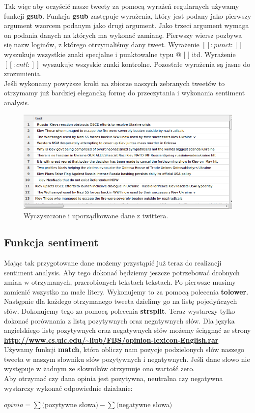 \documentclass[12pt,a4paper]{report}
\begin{document}
Tak więc aby oczyścić nasze tweety za pomocą wyrażeń regularnych używamy funkcji \textbf{gsub}. Funkcja \textbf{gsub} zastępuje wyrażenia, który jest podany jako pierwszy argument wzorcem podanym jako drugi argument. Jako trzeci argument wymaga on podania danych na których ma wykonać zamianę. Pierwszy wiersz pozbywa się nazw loginów, z którego otrzymaliśmy dany tweet. 
Wyrażenie \textbf{$[[:punct:]]$} wyszukuje wszystkie znaki specjalne i punktowalne typu @ [ ] itd. Wyrażenie \textbf{$[[:cntl:]]$} wyszukuje wszyskie znaki kontrolne. Pozostałe wyrażenia są jasne do zrozumienia. \\
Jeśli wykonamy powyższe kroki na zbiorze naszych zebranych tweetów to otrzymamy już bardziej elegancką formę do przeczytania i wykonania sentiment analysis.

\begin{figure}[H]
\begin{center}
\includegraphics[scale=0.5]{pictures/Data2.png}
\caption{Wyczyszczone i uporządkowane dane z twittera.}
\end{center}
\end{figure}


\subsection[Funkcja sentiment]{Funkcja sentiment}
Mając tak przygotowane dane możemy przystąpić już teraz do realizacji sentiment analysis. Aby tego dokonać będziemy jeszcze potrzebować drobnych zmian w otrzymanych, przerobionych tekstach tekstach. Po pierwsze musimy zamienić wszystko na małe litery. Wykonujemy to za pomocą polecenia \textbf{tolower}. 
Następnie dla każdego otrzymanego tweeta dzielimy go na listę pojedyńczych słów. Dokonujemy tego za pomocą polecenia \textbf{strsplit}. 
Teraz wystarczy tylko dokonać porównania z listą pozytywnych oraz negatywnych słów. Dla języka angielskiego listę pozytywnych oraz negatywnych słów możemy ściągnąć ze strony \textbf{\url{http://www.cs.uic.edu/~liub/FBS/opinion-lexicon-English.rar}} \\
Używamy funkcji \textbf{match}, która obliczy nam pozycje podzielonych słów naszego tweeta w naszym słowniku słów pozytywnych i negatywnych. Jeśli dane słowo nie występuje w żadnym ze słowników otrzymuje ono wartość zero. \\
Aby otrzymać czy dana opinia jest pozytywna, neutralna czy negatywna wystarczy  wykonać odpowiednie działanie: 
\begin{center}
$ opinia = \sum ($pozytywne słowa$) - \sum ($negatywne słowa$) $ \\
\end{center}
\end{document}
